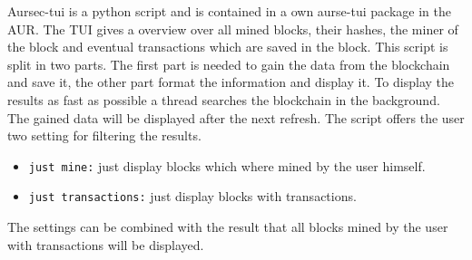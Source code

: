 \label{sec:tui}
Aursec-tui is a python script and is contained in a own aurse-tui package in the AUR. The TUI gives a overview over all mined blocks, their hashes, the miner of the block and eventual transactions which are saved in the block. This script is split in two parts. The first part is needed to gain the data from the blockchain and save it, the other part format the information and display it. To display the results as fast as possible a thread searches the blockchain in the background. The gained data will be displayed after the next refresh. The script offers the user two setting for filtering the results.
\begin{itemize}
	\item \texttt{just mine:} just display blocks which where mined by the user himself.
	\item \texttt{just transactions:} just display blocks with transactions.
\end{itemize}
The settings can be combined with the result that all blocks mined by the user with transactions will be displayed.